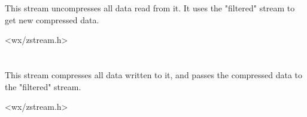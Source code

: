 \section{}\label{wxzlibinputstream}

This stream uncompresses all data read from it. It uses the "filtered"
stream to get new compressed data.




<wx/zstream.h>



\section{}\label{wxzliboutputstream}

This stream compresses all data written to it, and passes the compressed data
to the "filtered" stream.




<wx/zstream.h>



